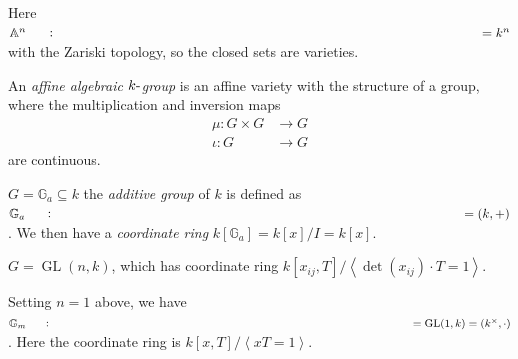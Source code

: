 Here \({\mathbb{A}}^n\mathrel{\vcenter{:}}= k^n\) with the Zariski
topology, so the closed sets are varieties.

\begin{definition}

\begin{definition}

An \emph{affine algebraic \(k{\hbox{-}}\)group} is an affine variety
with the structure of a group, where the multiplication and inversion
maps
\begin{align*}   \mu: G\times G &\to G \\ \iota: G&\to G \end{align*}
are continuous.

\end{definition}

\end{definition}

\begin{example}

\begin{example}

\(G = {\mathbb{G}}_a \subseteq k\) the \emph{additive group} of \(k\) is
defined as \({\mathbb{G}}_a \mathrel{\vcenter{:}}=(k, +)\). We then have
a \emph{coordinate ring} \(k[{\mathbb{G}}_a] = k[x] / I = k[x]\).

\end{example}

\end{example}

\begin{example}

\begin{example}

\(G = \operatorname{GL}(n, k)\), which has coordinate ring
\(k[x_{ij}, T] / \left\langle{\det(x_{ij})\cdot T = 1}\right\rangle\).

\end{example}

\end{example}

\begin{example}

\begin{example}

Setting \(n=1\) above, we have
\({\mathbb{G}}_m \mathrel{\vcenter{:}}=\operatorname{GL}(1, k) = (k^{\times}, \cdot)\).
Here the coordinate ring is
\(k[x, T] / \left\langle{xT = 1}\right\rangle\).

\end{example}

\end{example}

